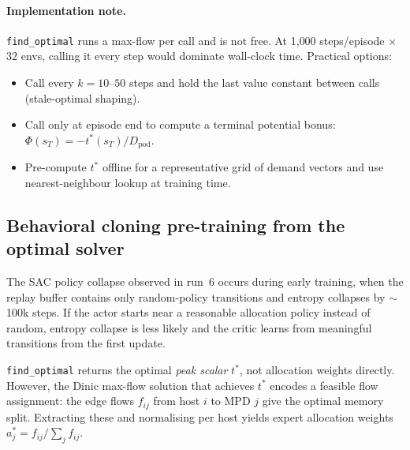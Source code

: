 \documentclass[11pt]{article}
\begin{document}
\paragraph{Implementation note.}
\texttt{find\_optimal} runs a max-flow per call and is not free.
At 1{,}000 steps/episode $\times$ 32 envs, calling it every step would dominate
wall-clock time.  Practical options:
\begin{itemize}
  \item Call every $k = 10$--$50$ steps and hold the last value constant between
        calls (stale-optimal shaping).
  \item Call only at episode end to compute a terminal potential bonus:
        $\Phi(s_T) = -t^*(s_T) / D_{\text{pod}}$.
  \item Pre-compute $t^*$ offline for a representative grid of demand vectors
        and use nearest-neighbour lookup at training time.
\end{itemize}

\subsection{Behavioral cloning pre-training from the optimal solver}

The SAC policy collapse observed in run~6 occurs during early training, when the
replay buffer contains only random-policy transitions and entropy collapses
by $\sim$100k steps.  If the actor starts near a reasonable allocation policy
instead of random, entropy collapse is less likely and the critic learns from
meaningful transitions from the first update.

\texttt{find\_optimal} returns the optimal \emph{peak scalar} $t^*$, not
allocation weights directly.  However, the Dinic max-flow solution that achieves
$t^*$ encodes a feasible flow assignment: the edge flows $f_{ij}$ from host $i$
to MPD $j$ give the optimal memory split.  Extracting these and normalising per
host yields expert allocation weights $a^*_j = f_{ij} / \sum_j f_{ij}$.
\end{document}
